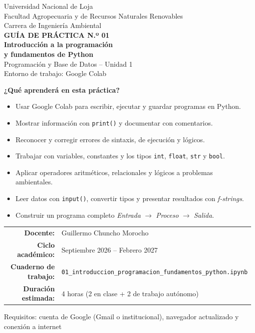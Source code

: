 \documentclass[11pt,a4paper]{article}
\newcommand{\code}[1]{\texttt{#1}}
\newcommand{\nbfile}{\texttt{01\_\allowbreak introduccion\_\allowbreak programacion\_\allowbreak fundamentos\_\allowbreak python.ipynb}}
\begin{document}
\begin{titlepage}
\centering
\vspace*{0.6cm}
{\large\color{grafito} Universidad Nacional de Loja}\\[2pt]
{\normalsize\color{grafito} Facultad Agropecuaria y de Recursos Naturales Renovables}\\[2pt]
{\normalsize\color{grafito} Carrera de Ingeniería Ambiental}\\[1.6cm]

{\large\color{moradoMedio}\bfseries GUÍA DE PRÁCTICA N.º 01}\\[10pt]
{\Huge\bfseries\color{morado} Introducción a la programación\\[4pt] y fundamentos de Python}\\[1.0cm]
{\Large\color{moradoOsc} Programación y Base de Datos -- Unidad 1}\\[6pt]
{\large\color{grafito} Entorno de trabajo: Google Colab}\\[1.4cm]

\begin{tcolorbox}[colback=moradoClaro!30,colframe=morado,arc=3pt,boxrule=1pt,width=0.86\textwidth,
  left=14pt,right=14pt,top=10pt,bottom=10pt]
\textbf{¿Qué aprenderá en esta práctica?}
\begin{itemize}[itemsep=3pt]
  \item Usar Google Colab para escribir, ejecutar y guardar programas en Python.
  \item Mostrar información con \code{print()} y documentar con comentarios.
  \item Reconocer y corregir errores de sintaxis, de ejecución y lógicos.
  \item Trabajar con variables, constantes y los tipos \code{int}, \code{float}, \code{str} y \code{bool}.
  \item Aplicar operadores aritméticos, relacionales y lógicos a problemas ambientales.
  \item Leer datos con \code{input()}, convertir tipos y presentar resultados con \emph{f-strings}.
  \item Construir un programa completo \emph{Entrada} $\rightarrow$ \emph{Proceso} $\rightarrow$ \emph{Salida}.
\end{itemize}
\end{tcolorbox}

\vspace{1.0cm}
\begin{tabular}{rl}
\textbf{Docente:} & Guillermo Chuncho Morocho \\
\textbf{Ciclo académico:} & Septiembre 2026 -- Febrero 2027 \\
\textbf{Cuaderno de trabajo:} & \nbfile{} \\
\textbf{Duración estimada:} & 4 horas (2 en clase + 2 de trabajo autónomo) \\
\end{tabular}

\vfill
{\small\color{grafito} Requisitos: cuenta de Google (Gmail o institucional), navegador actualizado y conexión a internet}
\end{titlepage}
\end{document}

